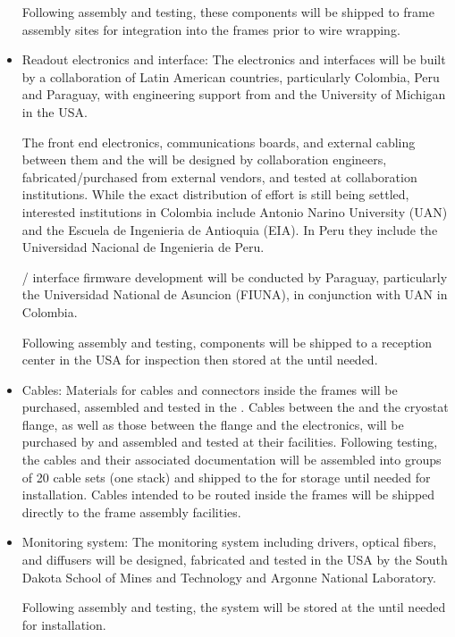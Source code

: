 \begin{itemize}
Following assembly and testing, these components will be shipped to  frame assembly sites for integration into the frames prior to wire wrapping.

\item Readout electronics and  interface:  The  electronics and  interfaces will be built by a collaboration of Latin American countries, particularly Colombia, Peru and Paraguay, with engineering support from  and the University of Michigan in the USA. 

The front end electronics, communications boards, and external cabling between them and the  will be designed by collaboration engineers, fabricated/purchased from external vendors, and tested at collaboration institutions.  While the exact distribution of effort is still being settled, interested institutions in Colombia include Antonio Narino University (UAN) and the Escuela de Ingenieria de Antioquia (EIA).  In Peru they include the Universidad Nacional de Ingenieria de Peru.

/ interface firmware development will be conducted by Paraguay, particularly the Universidad National de Asuncion (FIUNA), in conjunction with UAN in Colombia.

Following assembly and testing, components will be shipped to a reception center in the USA for inspection then stored at the  until needed.

\item Cables:  Materials for cables and connectors inside the  frames will be purchased, assembled and tested in the .  Cables between the  and the cryostat flange, as well as those between the flange and the  electronics, will be purchased by  and assembled and tested at their facilities.
Following testing, the cables and their associated  documentation will be assembled into groups of 20 cable sets (one  stack) and shipped to the  for storage until needed for installation.  Cables intended to be routed inside the  frames will be shipped directly to the  frame assembly facilities.

\item Monitoring system: The monitoring system including  drivers, optical fibers, and diffusers will be designed, fabricated and tested in the USA by the South Dakota School of Mines and Technology and Argonne National Laboratory. 

Following assembly and testing, the system will be stored at the  until needed for installation.

\end{itemize}

